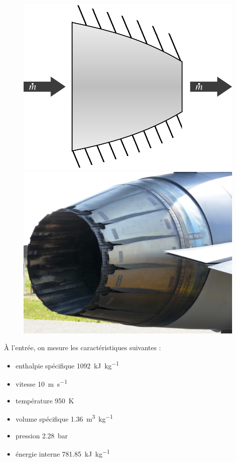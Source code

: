 	\begin{figure}
		\begin{center}
			\includegraphics[height=0.35\textwidth, max height=0.5\columnwidth]{images/symbole_tuyere.png}
			\hspace{0.3cm}
			\includegraphics[height=0.35\textwidth, max height=0.5\columnwidth]{images/nozzle_f100.jpg}
		\end{center}
		\label{fig_nozzle}
	\end{figure}

	
	À l’entrée, on mesure les caractéristiques suivantes :
		
	\begin{itemize}
		\item enthalpie spécifique 		\tab \SI{1092}{\kilo\joule\per\kilogram}
		\item vitesse  						\tab \SI{10}{\metre\per\second}
		\item température  					\tab \SI{950}{\kelvin}
		\item volume spécifique  			\tab \SI{1,36}{\metre\cubed\per\kilogram}
		\item pression  						\tab \SI{2,28}{\bar}
		\item énergie interne  				\tab \SI{781,85}{\kilo\joule\per\kilogram}
	\end{itemize}

